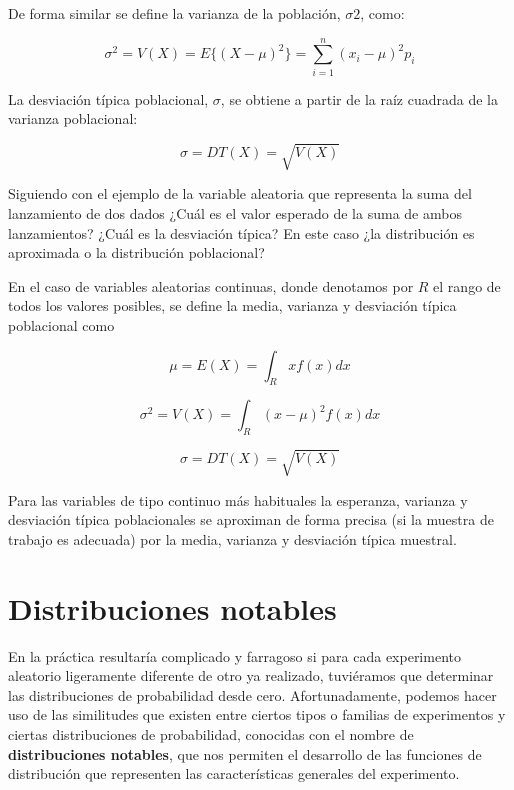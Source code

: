\documentclass[
]{book}
\begin{document}
De forma similar se define la varianza de la población, \(\sigma2\), como:

\begin{equation} 
  \sigma^2 = V(X) = E\{(X-\mu)^2\} = \sum_{i=1}^n  (x_i - \mu)^2 p_i
  \label{eq:vardisc}
\end{equation}

La desviación típica poblacional, \(\sigma\), se obtiene a partir de la raíz cuadrada de la varianza poblacional:

\begin{equation} 
  \sigma = DT(X) = \sqrt{V(X)}
  \label{eq:sddisc}
\end{equation}

Siguiendo con el ejemplo de la variable aleatoria que representa la suma del lanzamiento de dos dados ¿Cuál es el valor esperado de la suma de ambos lanzamientos? ¿Cuál es la desviación típica? En este caso ¿la distribución es aproximada o la distribución poblacional?

En el caso de variables aleatorias continuas, donde denotamos por \(R\) el rango de todos los valores posibles, se define la media, varianza y desviación típica poblacional como

\begin{equation} 
  \mu = E(X) = \int_R x f(x) dx
  \label{eq:espcont}
\end{equation}

\begin{equation} 
  \sigma^2 = V(X) = \int_R (x - \mu)^2 f(x) dx
  \label{eq:varcont}
\end{equation}

\begin{equation} 
  \sigma = DT(X) = \sqrt{V(X)}
  \label{eq:sdcont}
\end{equation}

Para las variables de tipo continuo más habituales la esperanza, varianza y desviación típica poblacionales se aproximan de forma precisa (si la muestra de trabajo es adecuada) por la media, varianza y desviación típica muestral.

\hypertarget{distribuciones-notables}{%
\section{Distribuciones notables}\label{distribuciones-notables}}

En la práctica resultaría complicado y farragoso si para cada experimento aleatorio ligeramente diferente de otro ya realizado, tuviéramos que determinar las distribuciones de probabilidad desde cero. Afortunadamente, podemos hacer uso de las similitudes que existen entre ciertos tipos o familias de experimentos y ciertas distribuciones de probabilidad, conocidas con el nombre de \textbf{distribuciones notables}, que nos permiten el desarrollo de las funciones de distribución que representen las características generales del experimento.
\end{document}
